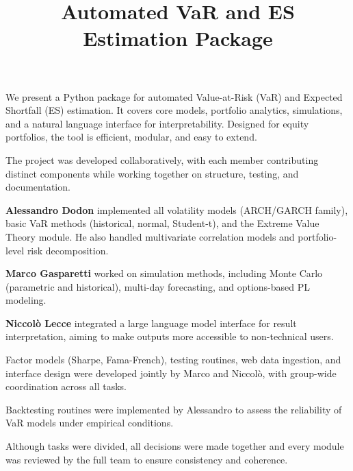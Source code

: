 \documentclass{article}
\title{Automated VaR and ES Estimation Package}
\author{}
\date{}
\begin{document}
\maketitle

We present a Python package for automated Value-at-Risk (VaR) and Expected Shortfall (ES) estimation. It covers core models, portfolio analytics, simulations, and a natural language interface for interpretability. Designed for equity portfolios, the tool is efficient, modular, and easy to extend.

The project was developed collaboratively, with each member contributing distinct components while working together on structure, testing, and documentation.

\textbf{Alessandro Dodon} implemented all volatility models (ARCH/GARCH family), basic VaR methods (historical, normal, Student-t), and the Extreme Value Theory module. He also handled multivariate correlation models and portfolio-level risk decomposition.

\textbf{Marco Gasparetti} worked on simulation methods, including Monte Carlo (parametric and historical), multi-day forecasting, and options-based PL modeling.

\textbf{Niccolò Lecce} integrated a large language model interface for result interpretation, aiming to make outputs more accessible to non-technical users.

Factor models (Sharpe, Fama-French), testing routines, web data ingestion, and interface design were developed jointly by Marco and Niccolò, with group-wide coordination across all tasks.

Backtesting routines were implemented by Alessandro to assess the reliability of VaR models under empirical conditions.

Although tasks were divided, all decisions were made together and every module was reviewed by the full team to ensure consistency and coherence.
\end{document}
